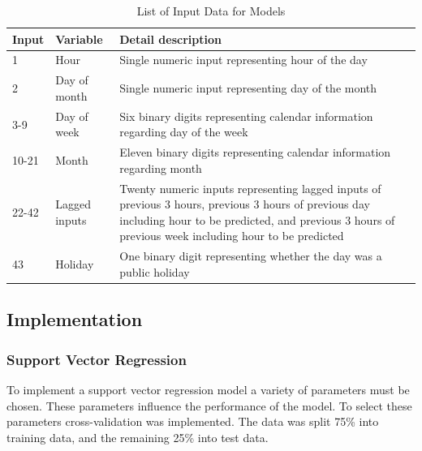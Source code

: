 \begin{table}
	\caption{List of Input Data for Models}
	\label{tab:feature}
	\begin{tabular}{p{1cm}p{1.8cm}p{4.8cm}}
		\toprule
		Input & Variable      & Detail description \\
		\midrule
		1     & Hour          & Single numeric input representing hour of the day                                                                                              \\
		2     & Day of month  & Single numeric input representing day of the month                                                                                             \\
		3-9   & Day of week   & Six binary digits representing calendar information regarding day of the week                                                                                            \\
		10-21 & Month         & Eleven binary digits representing calendar information regarding month                                                                                         \\
		22-42 & Lagged inputs & Twenty numeric inputs representing lagged inputs of previous 3 hours, previous 3 hours of previous day including hour to be predicted, and previous 3 hours of previous week including hour to be predicted \\
		43    & Holiday       & One binary digit representing whether the day was a public holiday  \\     \bottomrule                                                           
	\end{tabular}
\end{table}


\subsection{Implementation}

\subsubsection{Support Vector Regression}

To implement a support vector regression model a variety of parameters must be chosen. These parameters influence the performance of the model. To select these parameters cross-validation was implemented. The data was split 75\% into training data, and the remaining 25\% into test data.


